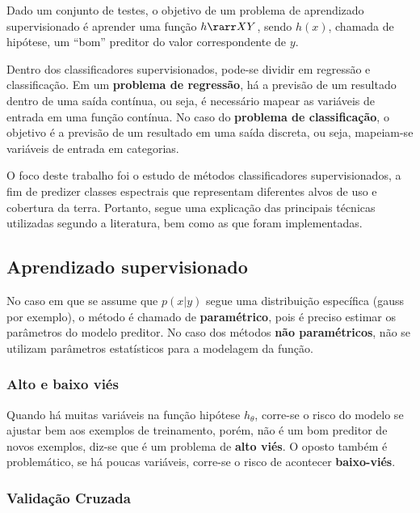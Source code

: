 Dado um conjunto de testes, o objetivo de um problema de aprendizado
supervisionado é aprender uma função $h \rarr XY$, sendo $h(x)$, chamada
de hipótese, um ``bom'' preditor do valor correspondente de $y$.

Dentro dos classificadores supervisionados, pode-se dividir em
regressão e classificação. Em um \textbf{problema de regressão}, há a
previsão de um resultado dentro de uma saída contínua, ou seja, é
necessário mapear as variáveis de entrada em uma função contínua. No
caso do \textbf{problema de classificação}, o objetivo é a previsão de
um resultado em uma saída discreta, ou seja, mapeiam-se variáveis de
entrada em categorias. \cite{coursera}

O foco deste trabalho foi o estudo de métodos classificadores
supervisionados, a fim de predizer classes espectrais que representam
diferentes alvos de uso e cobertura da terra. Portanto, segue uma
explicação das principais técnicas utilizadas segundo a literatura, bem
como as que foram implementadas.

\subsection{Aprendizado
supervisionado}\label{aprendizado-supervisionado}

No caso em que se assume que $p(x|y)$ segue uma distribuição
específica (gauss por exemplo), o método é chamado de
\textbf{paramétrico}, pois é preciso estimar os parâmetros do modelo
preditor. No caso dos métodos \textbf{não paramétricos}, não se utilizam
parâmetros estatísticos para a modelagem da função. \cite{waske2009machine}

\subsubsection{Alto e baixo viés}\label{alto-e-baixo-viuxe9s}

Quando há muitas variáveis na função hipótese $h_\theta$, corre-se o
risco do modelo se ajustar bem aos exemplos de treinamento, porém, não é
um bom preditor de novos exemplos, diz-se que é um problema de
\textbf{alto viés}. O oposto também é problemático, se há poucas
variáveis, corre-se o risco de acontecer \textbf{baixo-viés}. \cite{coursera}

\subsubsection{Validação Cruzada}\label{validauxe7uxe3o-cruzada}

